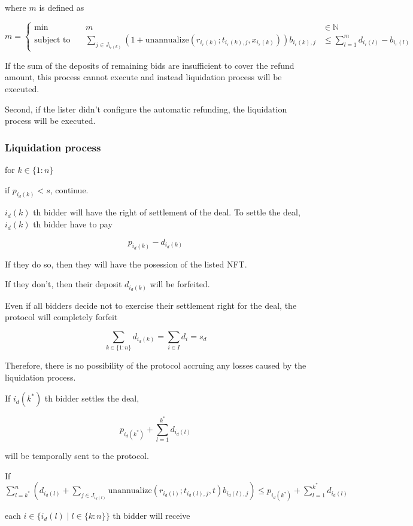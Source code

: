 \documentclass[dvipdfmx]{jsarticle}
\begin{document}
where $m$ is defined as

$$
  m = \left\{\begin{aligned}
    \min && \ m & \in \mathbb{N} \\
    \text{subject to} && \ \sum_{j \in J_{i_r(k)}} (1 + \text{unannualize}(r_{i_r(k)}; t_{i_r(k),j}, x_{i_r(k)})) b_{i_r(k),j} & \le \sum_{l=1}^m {d_{i_r(l)} - b_{i_r(l)}}
  \end{aligned}\right.
$$

If the sum of the deposits of remaining bids are insufficient to cover the refund amount, this process cannot execute and instead liquidation process will be executed.

Second, if the lister didn't configure the automatic refunding, the liquidation process will be executed.

\subsubsection{Liquidation process}

for $k \in \{1:n\}$

if $p_{i_d(k)} < s$, continue.

$i_d(k)$ th bidder will have the right of settlement of the deal.
To settle the deal, $i_d(k)$ th bidder have to pay

$$
  p_{i_d(k)} - d_{i_d(k)}
$$

If they do so, then they will have the posession of the listed NFT.

If they don't, then their deposit $d_{i_d(k)}$ will be forfeited.

Even if all bidders decide not to exercise their settlement right for the deal,
the protocol will completely forfeit 

$$
  \sum_{k \in \{1:n\}} d_{i_d(k)} = \sum_{i \in I} d_i = s_d
$$

Therefore, there is no possibility of the protocol accruing any losses caused by the liquidation process.

If $i_d(k^*)$ th bidder settles the deal,

$$
  p_{i_d(k^*)} + \sum_{l=1}^{k^*} d_{i_d(l)}
$$

will be temporally sent to the protocol.

If $\sum_{l=k^*}^n \left(d_{i_d(l)} + \sum_{j \in J_{i_d(l)}} \text{unannualize}(r_{i_d(l)}; t_{i_d(l),j}, t) b_{i_d(l),j} \right) \le p_{i_d(k^*)} + \sum_{l=1}^{k^*} d_{i_d(l)}$

each $i \in \{i_d(l) \mid l \in \{k:n\}\}$ th bidder will receive
\end{document}
